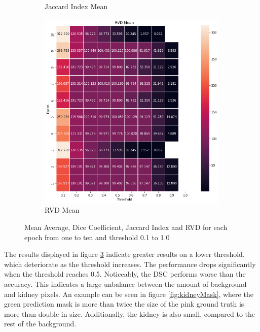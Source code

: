 \begin{figure}
\begin{subfigure}[b]{0.475\textwidth}
            \caption[Jaccard Index Mean]%
            {{\small Jaccard Index Mean}}    
            \label{fig:jMean}
        \end{subfigure}
        \hfill
        \begin{subfigure}[b]{0.475\textwidth}   
            \centering 
            \includegraphics[width=\textwidth]{PICs/rvd_mean.png}
            \caption[RVD Mean]%
            {{\small RVD Mean}}    
            \label{fig:rvdMean}
        \end{subfigure}
        \caption[ Mean Average, Dice Coefficient, Jaccard Index and RVD for each epoch from one to ten and threshold 0.1 to 1.0 ]
        {\small Mean Average, Dice Coefficient, Jaccard Index and RVD for each epoch from one to ten and threshold 0.1 to 1.0} 
        \label{fig:MeanValues}
    \end{figure}
    
The results displayed in figure \ref{fig:MeanValues} indicate greater results on a lower threshold, which deteriorate as the threshold increases. The performance drops significantly when the threshold reaches 0.5. Noticeably, the \ac{DSC} performs worse than the accuracy. This indicates a large unbalance between the amount of background and kidney pixels. An example can be seen in figure \ref{fig:kidneyMask}, where the green prediction mask is more than twice the size of the pink ground truth is more than double in size. Additionally, the kidney is also small, compared to the rest of the background.

